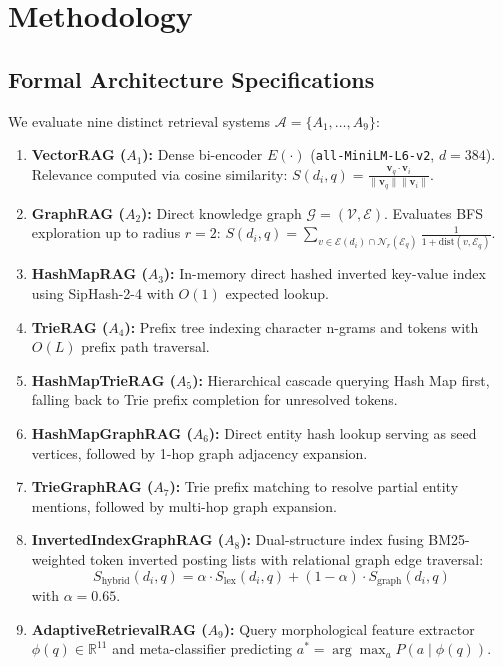 \documentclass[10pt,twocolumn,letterpaper]{article}
\begin{document}
\section{Methodology}

\subsection{Formal Architecture Specifications}
We evaluate nine distinct retrieval systems $\mathcal{A} = \{A_1, \dots, A_9\}$:
\begin{enumerate}
    \item \textbf{VectorRAG ($A_1$):} Dense bi-encoder $E(\cdot)$ (\texttt{all-MiniLM-L6-v2}, $d=384$). Relevance computed via cosine similarity: $S(d_i, q) = \frac{\mathbf{v}_q \cdot \mathbf{v}_i}{\|\mathbf{v}_q\|\|\mathbf{v}_i\|}$.
    \item \textbf{GraphRAG ($A_2$):} Direct knowledge graph $\mathcal{G} = (\mathcal{V}, \mathcal{E})$. Evaluates BFS exploration up to radius $r=2$: $S(d_i, q) = \sum_{v \in \mathcal{E}(d_i) \cap \mathcal{N}_r(\mathcal{E}_q)} \frac{1}{1 + \text{dist}(v, \mathcal{E}_q)}$.
    \item \textbf{HashMapRAG ($A_3$):} In-memory direct hashed inverted key-value index using SipHash-2-4 with $O(1)$ expected lookup.
    \item \textbf{TrieRAG ($A_4$):} Prefix tree indexing character n-grams and tokens with $O(L)$ prefix path traversal.
    \item \textbf{HashMapTrieRAG ($A_5$):} Hierarchical cascade querying Hash Map first, falling back to Trie prefix completion for unresolved tokens.
    \item \textbf{HashMapGraphRAG ($A_6$):} Direct entity hash lookup serving as seed vertices, followed by 1-hop graph adjacency expansion.
    \item \textbf{TrieGraphRAG ($A_7$):} Trie prefix matching to resolve partial entity mentions, followed by multi-hop graph expansion.
    \item \textbf{InvertedIndexGraphRAG ($A_8$):} Dual-structure index fusing BM25-weighted token inverted posting lists with relational graph edge traversal:
    \begin{equation}
        S_{\text{hybrid}}(d_i, q) = \alpha \cdot S_{\text{lex}}(d_i, q) + (1-\alpha) \cdot S_{\text{graph}}(d_i, q)
    \end{equation}
    with $\alpha = 0.65$.
    \item \textbf{AdaptiveRetrievalRAG ($A_9$):} Query morphological feature extractor $\phi(q) \in \mathbb{R}^{11}$ and meta-classifier predicting $a^* = \arg\max_{a} P(a \mid \phi(q))$.
\end{enumerate}
\end{document}
